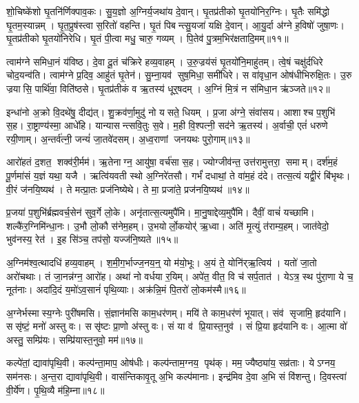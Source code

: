 शो॒चिष्के॑शो घृ॒तनि॑र्णिक्पाव॒कः।
सु॒य॒ज्ञो अ॒ग्निर्य॒जथा॑य दे॒वान्।
घृ॒तप्र॑तीको घृ॒तयो॑निर॒ग्निः।
घृ॒तैः समि॑द्धो घृ॒तम॒स्यान्नम्।
घृ॒त॒प्रुष॑स्त्वा स॒रितो॑ वहन्ति।
घृ॒तं पिबन्त्सु॒यजा॑ यक्षि दे॒वान्।
आ॒यु॒र्दा अ॑ग्ने ह॒विषो॑ जुषा॒णः।
घृ॒तप्र॑तीको घृ॒तयो॑निरेधि।
घृ॒तं पी॒त्वा मधु॒ चारु॒ गव्यम्।
पि॒तेव॑ पु॒त्रम॒भिर॑क्षतादि॒मम्॥११॥

त्वाम॑ग्ने समिधा॒नं य॑विष्ठ।
दे॒वा दू॒तं च॑क्रिरे हव्य॒वाहम्।
उ॒रु॒ज्रय॑सं घृ॒तयो॑नि॒माहु॑तम्।
त्वे॒षं चक्षु॑र्दधिरे चोद॒यन्व॑ति।
त्वाम॑ग्ने प्र॒दिव॒ आहु॑तं घृ॒तेन॑।
सु॒म्ना॒यव॑ सुष॒मिधा॒ समी॑धिरे।
स वा॑वृधा॒न ओष॑धीभिरुक्षि॒तः।
उ॒रु ज्रयासि॒ पार्थि॑वा॒ विति॑ष्ठसे।
घृ॒तप्र॑तीकं व ऋ॒तस्य॑ धूर्॒षदम्।
अ॒ग्निं मि॒त्रं न स॑मिधा॒न ऋ॑ञ्जते॥१२॥

इन्धा॑नो अ॒क्रो वि॒दथे॑षु॒ दीद्य॑त्।
शु॒क्रव॑र्णा॒मुदु॑ नो यसते॒ धियम्।
प्र॒जा अ॑ग्ने॒ संवा॑सय।
आशाश्च प॒शुभि॑ स॒ह।
रा॒ष्ट्राण्य॑स्मा॒ आधे॑हि।
यान्यासन्त्सवि॒तुः स॒वे।
म॒ही वि॒श्पत्नी॒ सद॑ने ऋ॒तस्य॑।
अ॒र्वाची॒ एतं॑ धरुणे रयी॒णाम्।
अ॒न्तर्व॑त्नी॒ जन्यं॑ जा॒तवे॑दसम्।
अ॒ध्व॒राणां जनयथः पुरो॒गाम्॥१३॥

आरो॑हतं द॒शत॒ शक्व॑री॒र्मम॑।
ऋ॒तेनाग्न॒ आयु॑षा॒ वर्च॑सा स॒ह।
ज्योग्जीव॑न्त॒ उत्त॑रामुत्तरा॒ समाम्।
दर्\mbox{}श॑म॒हं पू॒र्णमा॑सं य॒ज्ञं यथा॒ यजै।
ऋत्वि॑यवती स्थो अ॒ग्निरे॑तसौ।
गर्भं॑ दधाथां॒ ते वा॑म॒हं द॑दे।
तत्स॒त्यं यद्वी॒रं बि॑भृथः।
वी॒रं ज॑नयि॒ष्यथ॑।
ते मत्प्रा॒तः प्रज॑निष्येथे।
ते मा॒ प्रजा॑ते॒ प्रज॑नयि॒ष्यथ॑॥१४॥

प्र॒जया॑ प॒शुभि॑र्ब्रह्मवर्च॒सेन॑ सुव॒र्गे लो॒के।
अनृ॑तात्स॒त्यमुपै॑मि।
मा॒नु॒षाद्देव्य॒मुपै॑मि।
दैवीं॒ वाचं॑ यच्छामि।
शल्कै॑र॒ग्निमि॑न्धा॒नः।
उ॒भौ लो॒कौ स॑नेम॒हम्।
उ॒भयोर्लो॒कयोर्॑ ऋ॒ध्वा।
अति॑ मृ॒त्युं त॑राम्य॒हम्।
जात॑वेदो॒ भुव॑नस्य॒ रेत॑।
इ॒ह सि॑ञ्च॒ तप॑सो॒ यज्ज॑नि॒ष्यते॥१५॥

अ॒ग्निम॑श्व॒त्थादधि॑ हव्य॒वाहम्।
श॒मी॒ग॒र्भाज्ज॒नय॒न्॒ यो म॑यो॒भूः।
अ॒यं ते॒ योनि॑र्‌ऋ॒त्विय॑।
यतो॑ जा॒तो अरो॑चथाः।
तं जा॒नन्न॑ग्न॒ आरो॑ह।
अथा॑ नो वर्धया र॒यिम्।
अपे॑त॒ वीत॒ वि च॑ सर्प॒तात॑।
येऽत्र॒ स्थ पु॑रा॒णा ये च॒ नूत॑नाः।
अदा॑दि॒दं य॒मो॑ऽव॒सानं॑ पृथि॒व्याः।
अक्र॑न्नि॒मं पि॒तरो॑ लो॒कम॑स्मै॥१६॥

अ॒ग्नेर्भस्मास्य॒ग्नेः पुरी॑षमसि।
सं॒ज्ञान॑मसि काम॒धर॑णम्।
मयि॑ ते काम॒धर॑णं भूयात्।
संव॑ सृजामि॒ हृद॑यानि।
ससृ॑ष्टं॒ मनो॑ अस्तु वः।
ससृ॑ष्टः प्रा॒णो अ॑स्तु वः।
सं या व॑ प्रि॒यास्त॒नुव॑।
सं प्रि॒या हृद॑यानि वः।
आ॒त्मा वो॑ अस्तु॒ सम्प्रि॑यः।
सम्प्रि॑यास्त॒नुवो॒ मम॑॥१७॥

कल्पे॑तां॒ द्यावा॑पृथि॒वी।
कल्प॑न्ता॒माप॒ ओष॑धीः।
कल्प॑न्ताम॒ग्नय॒ पृथ॑क्।
मम॒ ज्यैष्ठ्या॑य॒ सव्र॑ताः।
येऽग्नय॒ सम॑नसः।
अ॒न्त॒रा द्यावा॑पृथि॒वी।
वास॑न्तिकावृ॒तू अ॒भि कल्प॑मानाः।
इन्द्र॑मिव दे॒वा अ॒भि सं वि॑शन्तु।
दि॒वस्त्वा॑ वी॒र्ये॑ण।
पृ॒थि॒व्यै म॑हि॒म्ना॥१८॥

